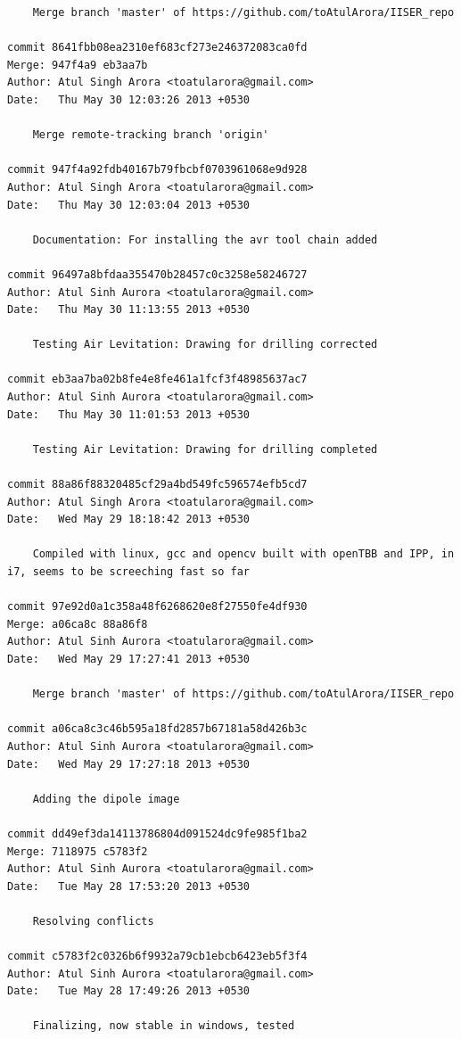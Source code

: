 \begin{lstlisting}
    Merge branch 'master' of https://github.com/toAtulArora/IISER_repo

commit 8641fbb08ea2310ef683cf273e246372083ca0fd
Merge: 947f4a9 eb3aa7b
Author: Atul Singh Arora <toatularora@gmail.com>
Date:   Thu May 30 12:03:26 2013 +0530

    Merge remote-tracking branch 'origin'

commit 947f4a92fdb40167b79fbcbf0703961068e9d928
Author: Atul Singh Arora <toatularora@gmail.com>
Date:   Thu May 30 12:03:04 2013 +0530

    Documentation: For installing the avr tool chain added

commit 96497a8bfdaa355470b28457c0c3258e58246727
Author: Atul Sinh Aurora <toatularora@gmail.com>
Date:   Thu May 30 11:13:55 2013 +0530

    Testing Air Levitation: Drawing for drilling corrected

commit eb3aa7ba02b8fe4e8fe461a1fcf3f48985637ac7
Author: Atul Sinh Aurora <toatularora@gmail.com>
Date:   Thu May 30 11:01:53 2013 +0530

    Testing Air Levitation: Drawing for drilling completed

commit 88a86f88320485cf29a4bd549fc596574efb5cd7
Author: Atul Singh Arora <toatularora@gmail.com>
Date:   Wed May 29 18:18:42 2013 +0530

    Compiled with linux, gcc and opencv built with openTBB and IPP, in i7, seems to be screeching fast so far

commit 97e92d0a1c358a48f6268620e8f27550fe4df930
Merge: a06ca8c 88a86f8
Author: Atul Sinh Aurora <toatularora@gmail.com>
Date:   Wed May 29 17:27:41 2013 +0530

    Merge branch 'master' of https://github.com/toAtulArora/IISER_repo

commit a06ca8c3c46b595a18fd2857b67181a58d426b3c
Author: Atul Sinh Aurora <toatularora@gmail.com>
Date:   Wed May 29 17:27:18 2013 +0530

    Adding the dipole image

commit dd49ef3da14113786804d091524dc9fe985f1ba2
Merge: 7118975 c5783f2
Author: Atul Sinh Aurora <toatularora@gmail.com>
Date:   Tue May 28 17:53:20 2013 +0530

    Resolving conflicts

commit c5783f2c0326b6f9932a79cb1ebcb6423eb5f3f4
Author: Atul Sinh Aurora <toatularora@gmail.com>
Date:   Tue May 28 17:49:26 2013 +0530

    Finalizing, now stable in windows, tested


\end{lstlisting}
